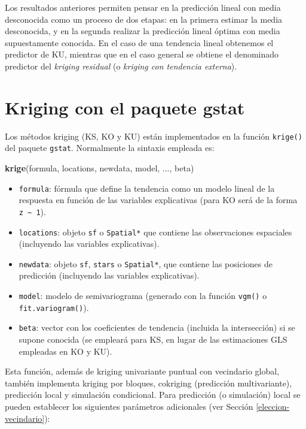 \documentclass[
]{book}
\newenvironment{Shaded}{\begin{snugshade}}{\end{snugshade}}
\newcommand{\FunctionTok}[1]{\textcolor[rgb]{0.13,0.29,0.53}{\textbf{#1}}}
\newcommand{\NormalTok}[1]{#1}
\providecommand{\tightlist}{%
  \setlength{\itemsep}{0pt}\setlength{\parskip}{0pt}}
\theoremstyle{break}
\theoremstyle{definition}
\theoremstyle{definition}
\theoremstyle{definition}
\theoremstyle{definition}
\theoremstyle{remark}
\begin{document}
Los resultados anteriores permiten pensar en la predicción lineal con media desconocida como un proceso de dos etapas: en la primera estimar la media desconocida, y en la segunda realizar la predicción lineal óptima con media supuestamente conocida.
En el caso de una tendencia lineal obtenemos el predictor de KU, mientras que en el caso general se obtiene el denominado predictor del \emph{kriging residual} (o \emph{kriging con tendencia externa}).

\section{\texorpdfstring{Kriging con el paquete \textbf{gstat}}{Kriging con el paquete gstat}}\label{kriging-gstat}

Los métodos kriging (KS, KO y KU) están implementados en la función \texttt{krige()} del paquete \texttt{gstat}.
Normalmente la sintaxis empleada es:

\begin{Shaded}
\begin{Highlighting}[]
\FunctionTok{krige}\NormalTok{(formula, locations, newdata, model, ..., beta)}
\end{Highlighting}
\end{Shaded}

\begin{itemize}
\tightlist
\item
  \texttt{formula}: fórmula que define la tendencia como un modelo lineal de la respuesta en función de las variables explicativas (para KO será de la forma \texttt{z\ \textasciitilde{}\ 1}).
\item
  \texttt{locations}: objeto \texttt{sf} o \texttt{Spatial*} que contiene las observaciones espaciales (incluyendo las variables explicativas).
\item
  \texttt{newdata}: objeto \texttt{sf}, \texttt{stars} o \texttt{Spatial*}, que contiene las posiciones de predicción (incluyendo las variables explicativas).
\item
  \texttt{model}: modelo de semivariograma (generado con la función \texttt{vgm()} o \texttt{fit.variogram()}).
\item
  \texttt{beta}: vector con los coeficientes de tendencia (incluida la intersección) si se supone conocida (se empleará para KS, en lugar de las estimaciones GLS empleadas en KO y KU).
\end{itemize}

Esta función, además de kriging univariante puntual con vecindario global, también implementa kriging por bloques, cokriging (predicción multivariante), predicción local y simulación condicional.
Para predicción (o simulación) local se pueden establecer los siguientes parámetros adicionales (ver Sección \ref{eleccion-vecindario}):
\end{document}
